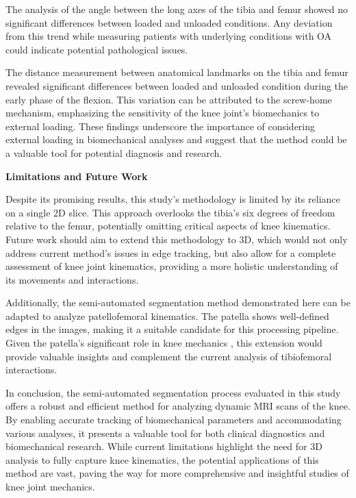 \documentclass{micro-econ-thesis}
\begin{document}
The analysis of the angle between the long axes of the tibia and femur showed no significant differences between loaded and unloaded conditions. Any deviation from this trend while measuring patients with underlying conditions with OA could indicate potential pathological issues.

The distance measurement between anatomical landmarks on the tibia and femur revealed significant differences between loaded and unloaded condition during the early phase of the flexion. This variation can be attributed to the screw-home mechanism, emphasizing the sensitivity of the knee joint's biomechanics to external loading. These findings underscore the importance of considering external loading in biomechanical analyses and suggest that the method could be a valuable tool for potential diagnosis and research.



\textbf{Limitations and Future Work}

Despite its promising results, this study's methodology is limited by its reliance on a single 2D slice. This approach overlooks the tibia's six degrees of freedom relative to the femur, potentially omitting critical aspects of knee kinematics. Future work should aim to extend this methodology to 3D, which would not only address current method's issues in edge tracking, but also allow for a complete assessment of knee joint kinematics, providing a more holistic understanding of its movements and interactions.

Additionally, the semi-automated segmentation method demonstrated here can be adapted to analyze patellofemoral kinematics. The patella shows well-defined edges in the images, making it a suitable candidate for this processing pipeline. Given the patella's significant role in knee mechanics \parencite{powers_evidence-based_2017}, this extension would provide valuable insights and complement the current analysis of tibiofemoral interactions.

In conclusion, the semi-automated segmentation process evaluated in this study offers a robust and efficient method for analyzing dynamic MRI scans of the knee. By enabling accurate tracking of biomechanical parameters and accommodating various analyses, it presents a valuable tool for both clinical diagnostics and biomechanical research. While current limitations highlight the need for 3D analysis to fully capture knee kinematics, the potential applications of this method are vast, paving the way for more comprehensive and insightful studies of knee joint mechanics.
\cleardoublepage
{}
{} %
\printbibliography
\end{document}
